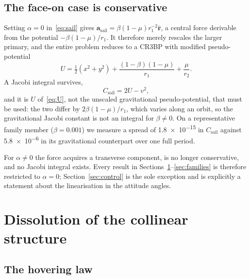 \documentclass[11pt,a4paper]{article}
\newcommand{\rhat}{\hat{\bm{r}}}
\begin{document}
\subsection{The face-on case is conservative}

Setting $\alpha=0$ in~\eqref{eq:sail} gives
$\bm{a}_{\mathrm{sail}}=\beta(1-\mu)r_1^{-2}\rhat$, a central force derivable
from the potential $-\beta(1-\mu)/r_1$. It therefore merely rescales the larger
primary, and the entire problem reduces to a CR3BP with modified pseudo-potential
\begin{equation}
  U = \tfrac{1}{2}\!\left(x^{2}+y^{2}\right)
      + \frac{(1-\beta)(1-\mu)}{r_1} + \frac{\mu}{r_2} .
  \label{eq:U}
\end{equation}
A Jacobi integral survives,
\begin{equation}
  C_{\mathrm{sail}} = 2U - v^{2},
  \label{eq:jacobi}
\end{equation}
and it is $U$ of~\eqref{eq:U}, not the unscaled gravitational pseudo-potential,
that must be used: the two differ by $2\beta(1-\mu)/r_1$, which varies along an
orbit, so the gravitational Jacobi constant is not an integral for $\beta\neq0$.
On a representative family member ($\beta=0.001$) we measure a spread of
\num{1.8e-15} in $C_{\mathrm{sail}}$ against \num{5.8e-6} in its gravitational
counterpart over one full period.

For $\alpha\neq0$ the force acquires a transverse component, is no longer
conservative, and no Jacobi integral exists. Every result in
Sections~\ref{sec:dissolution}--\ref{sec:families} is therefore restricted to
$\alpha=0$; Section~\ref{sec:control} is the sole exception and is explicitly a
statement about the linearisation in the attitude angles.

\section{Dissolution of the collinear structure}\label{sec:dissolution}

\subsection{The hovering law}
\end{document}
